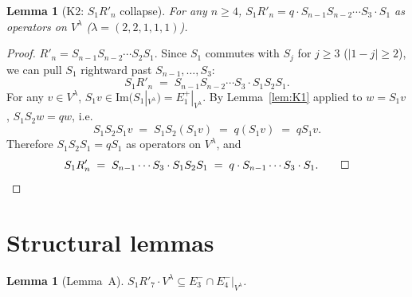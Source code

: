 \documentclass[11pt]{article}
\newtheorem{lemma}[theorem]{Lemma}
\theoremstyle{definition}
\newcommand{\Vlam}{V^\lambda}
\newcommand{\Rp}{R'}
\newcommand{\Eplus}[1]{E^+_{#1}}
\newcommand{\Eminus}[1]{E^-_{#1}}
\begin{document}
\begin{lemma}[K2: $S_1 \Rp_n$ collapse]\label{lem:K2}
For any $n \ge 4$, $S_1 \Rp_n = q \cdot S_{n-1} S_{n-2} \cdots S_3 \cdot S_1$ as
operators on $\Vlam$ ($\lambda = (2,2,1,1,1)$).
\end{lemma}

\begin{proof}
$\Rp_n = S_{n-1} S_{n-2} \cdots S_2 S_1$. Since $S_1$ commutes with $S_j$ for $j \ge 3$
($|1-j| \ge 2$), we can pull $S_1$ rightward past $S_{n-1}, \ldots, S_3$:
\[
   S_1 \Rp_n \;=\; S_{n-1} S_{n-2} \cdots S_3 \cdot S_1 S_2 S_1.
\]
For any $v \in \Vlam$, $S_1 v \in \mathrm{Im}(S_1|_{\Vlam}) = \Eplus 1|_{\Vlam}$.
By Lemma~\ref{lem:K1} applied to $w = S_1 v$, $S_1 S_2 w = q w$, i.e.\
\[
   S_1 S_2 S_1 v \;=\; S_1 S_2 (S_1 v) \;=\; q (S_1 v) \;=\; q S_1 v.
\]
Therefore $S_1 S_2 S_1 = q S_1$ as operators on $\Vlam$, and
\[
   S_1 \Rp_n \;=\; S_{n-1} \cdots S_3 \cdot S_1 S_2 S_1
   \;=\; q \cdot S_{n-1} \cdots S_3 \cdot S_1.\qed
\]
\end{proof}

\section{Structural lemmas}

\begin{lemma}[Lemma~A]\label{lem:A}
$S_1 \Rp_7 \cdot \Vlam \subseteq \Eminus 3 \cap \Eminus 4|_{\Vlam}$.
\end{lemma}
\end{document}
